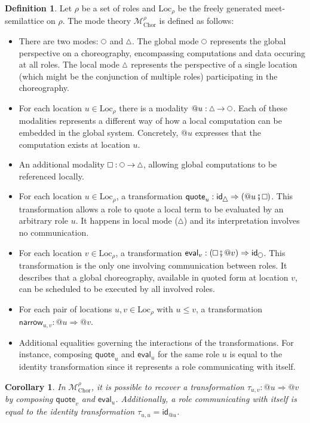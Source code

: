 \documentclass{scrartcl}
\theoremstyle{definition}
\newtheorem{definition}{Definition}
\theoremstyle{plain}
\newtheorem{corollary}{Corollary}
\renewcommand{\square}%
  {\tikz{\draw (0,0) rectangle (0.2cm,0.2cm);}}
\renewcommand{\circle}%
  {\tikz{\draw (0,0) circle [radius=0.1cm];}}
\renewcommand{\triangle}%
  {\tikz{\draw (0,0) -- (0.2cm,0) -- (0.1cm,0.2cm) -- (0,0);}}
\begin{document}
\begin{definition}
Let $\rho$ be a set of roles and $\textrm{Loc}_\rho$ be the freely generated
meet-semilattice on $\rho$. The mode theory $\mathcal{M}^\rho_{\textrm{Chor}}$
is defined as follows:
\begin{itemize}
\item
  There are two modes: $\circle$ and $\triangle$. The global mode $\circle$
  represents the global perspective on a choreography, encompassing
  computations and data occuring at all roles. The local mode $\triangle$
  represents the perspective of a single location (which might be the
  conjunction of multiple roles) participating in the choreography.
\item
  For each location $u \in \textrm{Loc}_\rho$ there is a modality $@u :
  \triangle \to \circle$. Each of these modalities represents a different way
  of how a local computation can be embedded in the global system. Concretely,
  $@u$ expresses that the computation exists at location $u$.
\item
  An additional modality $\square : \circle \to \triangle$, allowing global
  computations to be referenced locally.
\item
  For each location $u \in \textrm{Loc}_\rho$, a transformation
  $\textsf{quote}_u : \textsf{id}_{\triangle} \Rightarrow ({}@ u \fatsemi
  \square)$. This transformation allows a role to quote a local term to be
  evaluated by an arbitrary role $u$. It happens in local mode ($\triangle$)
  and its interpretation involves no communication.
\item
  For each location $v \in \textrm{Loc}_\rho$, a transformation
  $\textsf{eval}_v : (\square \fatsemi {}@ v) \Rightarrow
  \textsf{id}_{\circle}$. This transformation is the only one involving
  communication between roles. It describes that a global choreography,
  available in quoted form at location $v$, can be scheduled to be executed by
  all involved roles.
\item
  For each pair of locations $u, v \in \textrm{Loc}_\rho$ with $u \leq v$, a
  transformation $\textsf{narrow}_{u,v} : @u \Rightarrow @v$.
\item
  Additional equalities governing the interactions of the transformations. For
  instance, composing $\textsf{quote}_u$ and $\textsf{eval}_u$ for the same
  role $u$ is equal to the identity transformation since it represents a
  role communicating with itself.
\end{itemize}
\end{definition}
\begin{corollary}
  In {\upshape$\mathcal{M}^{\rho}_{\textrm{Chor}}$}, it is possible to recover
  a transformation $\tau_{u,v} : @u \Rightarrow @v$ by composing
  {\upshape$\textsf{quote}_v$} and {\upshape$\textsf{eval}_u$}. Additionally, a
  role communicating with itself is equal to the identity transformation
  {\upshape$\tau_{u,u} = \textsf{id}_{@u}$}.
\end{corollary}
\end{document}
